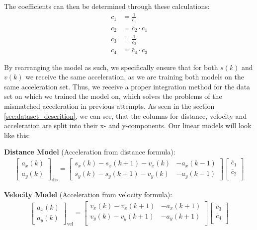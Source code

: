 The coefficients can then be determined through these calculations:
\begin{align}
   c_1 &= \frac{1}{\bar{c}_1} \\
   c_2 &= \bar{c}_2 \cdot c_1 \\
   c_3 &= \frac{1}{\bar{c}_3} \\
   c_4 &= \bar{c}_4 \cdot c_3
\end{align}

By rearranging the model as such, we specifically ensure that for both $s(k)$ and $v(k)$ we receive the same 
acceleration, as we are training both models on the same acceleration set.
Thus, we receive a proper integration method for the data set on which we trained the model on, which solves the 
problems of the mismatched acceleration in previous attempts.
As seen in the section \ref{sec:dataset_descrition}, we can see, that the columns for distance, velocity and acceleration are 
split into their x- and y-components.
Our linear models will look like this:

\hfil

\textbf{Distance Model} (Acceleration from distance formula):
{\footnotesize
\begin{align} \label{eq:lin_model_acc_dis}
    \begin{bmatrix}
        a_x(k) \\ 
        a_y(k)       
    \end{bmatrix}_{\text{dis}}
    =
    \begin{bmatrix}
       s_x(k) - s_x(k+1) - v_x(k) & -a_x(k-1) \\ 
       s_y(k) - s_y(k+1) - v_y(k) & -a_y(k-1)   
    \end{bmatrix}
    \begin{bmatrix}
        \overline{c}_1 \\
        \overline{c}_2 \\
   \end{bmatrix}
\end{align}
}

\textbf{Velocity Model} (Acceleration from velocity formula):
\begin{align} \label{eq:lin_model_acc_vel}
    \begin{bmatrix}
        a_x(k) \\ 
        a_y(k) 
    \end{bmatrix}_{\text{vel}}
    =
    \begin{bmatrix}
        v_x(k) - v_x(k+1) & -a_x(k+1)    \\ 
        v_y(k) - v_y(k+1) & -a_y(k+1)    \\
    \end{bmatrix}
    \begin{bmatrix}
        \overline{c}_3 \\
        \overline{c}_4 \\
   \end{bmatrix}
\end{align}

